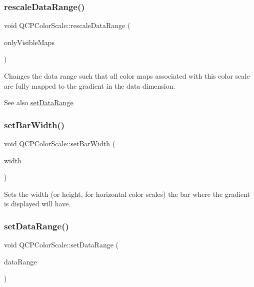 \mbox{\label{class_q_c_p_color_scale_a425983db4478543924ddbd04ea20a356}} 
\subsubsection{\texorpdfstring{rescale\+Data\+Range()}{rescaleDataRange()}}
{\footnotesize\ttfamily void Q\+C\+P\+Color\+Scale\+::rescale\+Data\+Range (\begin{DoxyParamCaption}\item[{bool}]{only\+Visible\+Maps }\end{DoxyParamCaption})}

Changes the data range such that all color maps associated with this color scale are fully mapped to the gradient in the data dimension.

\begin{DoxySeeAlso}{See also}
\mbox{\hyperlink{class_q_c_p_color_scale_abe88633003a26d1e756aa74984587fef}{set\+Data\+Range}} 
\end{DoxySeeAlso}
\mbox{\label{class_q_c_p_color_scale_ab9dcc0c1cd583477496209b1413bcb99}} 
\subsubsection{\texorpdfstring{set\+Bar\+Width()}{setBarWidth()}}
{\footnotesize\ttfamily void Q\+C\+P\+Color\+Scale\+::set\+Bar\+Width (\begin{DoxyParamCaption}\item[{int}]{width }\end{DoxyParamCaption})}

Sets the width (or height, for horizontal color scales) the bar where the gradient is displayed will have. \mbox{\label{class_q_c_p_color_scale_abe88633003a26d1e756aa74984587fef}} 
\subsubsection{\texorpdfstring{set\+Data\+Range()}{setDataRange()}}
{\footnotesize\ttfamily void Q\+C\+P\+Color\+Scale\+::set\+Data\+Range (\begin{DoxyParamCaption}\item[{const \mbox{\hyperlink{class_q_c_p_range}{Q\+C\+P\+Range}} \&}]{data\+Range }\end{DoxyParamCaption})}

